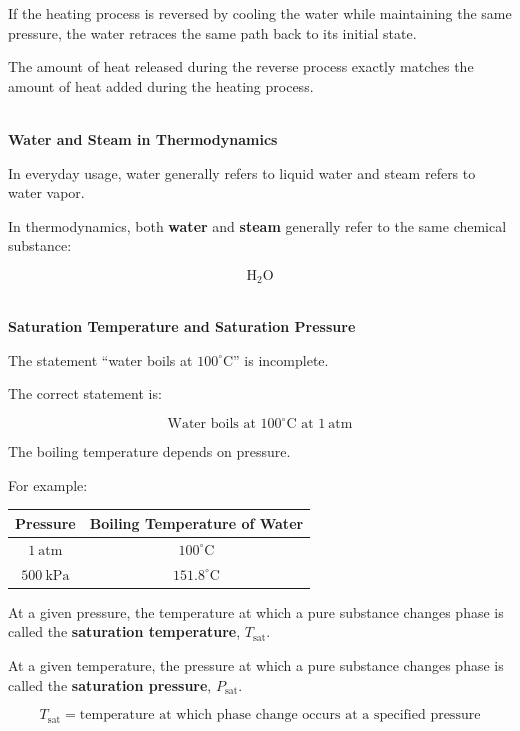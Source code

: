 \documentclass[12pt]{article}
\begin{document}
If the heating process is reversed by cooling the water while maintaining the same pressure, the water retraces the same path back to its initial state.

The amount of heat released during the reverse process exactly matches the amount of heat added during the heating process.

\textbf{\\ Water and Steam in Thermodynamics}

In everyday usage, water generally refers to liquid water and steam refers to water vapor.

In thermodynamics, both \textbf{water} and \textbf{steam} generally refer to the same chemical substance:

\begin{equation*}
\boxed{\mathrm{H_2O}}
\end{equation*}

\textbf{\\ Saturation Temperature and Saturation Pressure}

The statement ``water boils at $100^\circ\mathrm{C}$'' is incomplete.

The correct statement is:

\begin{equation*}
\boxed{\text{Water boils at }100^\circ\mathrm{C}\text{ at }1~\mathrm{atm}}
\end{equation*}

The boiling temperature depends on pressure.

For example:
\begin{center}
    \begin{tabular}{|c|c|}
        \hline
        \textbf{Pressure} & \textbf{Boiling Temperature of Water} \\
        \hline
        $1~\mathrm{atm}$ & $100^\circ\mathrm{C}$ \\
        \hline
        $500~\mathrm{kPa}$ & $151.8^\circ\mathrm{C}$ \\
        \hline
    \end{tabular}
\end{center}

At a given pressure, the temperature at which a pure substance changes phase is called the \textbf{saturation temperature}, $T_{\mathrm{sat}}$.

At a given temperature, the pressure at which a pure substance changes phase is called the \textbf{saturation pressure}, $P_{\mathrm{sat}}$.

\begin{equation*}
\boxed{T_{\mathrm{sat}}=\text{temperature at which phase change occurs at a specified pressure}}
\end{equation*}
\end{document}
